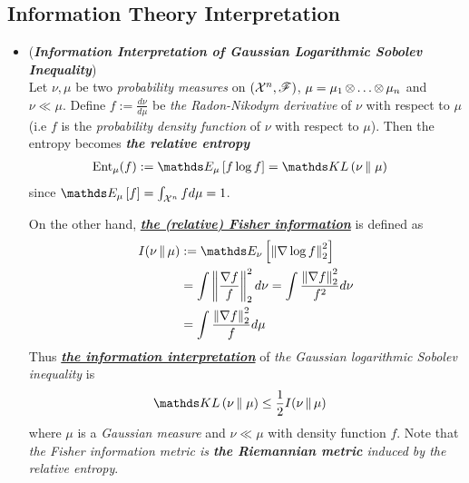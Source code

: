 \documentclass[11pt]{article}
\begin{document}
\subsection{Information Theory Interpretation}
\begin{itemize}
\item \begin{remark} (\textbf{\emph{Information Interpretation of Gaussian Logarithmic Sobolev Inequality}})\\
Let $\nu,\mu$ be two \emph{probability measures} on $({\mathcal X}^n, {\mathscr F})$, $\mu = \mu_1 \,{\otimes}\ldots{\otimes}\, \mu_n$ and $\nu \ll \mu$. Define $f:= \frac{d\nu}{d\mu}$ be \emph{the Radon-Nikodym derivative} of $\nu$ with respect to $\mu$ (i.e $f$ is the \emph{probability density function} of $\nu$ with respect to $\mu$). Then the entropy becomes \textbf{\emph{the relative entropy}}
\begin{align*}
\text{Ent}_{\mu}(f) &:= \E{\mu}{f \log f} = \kl{\nu}{\mu}
\end{align*} since $\E{\mu}{f} = \int_{\cX^n} fd\mu = 1$.

On the other hand, \underline{\emph{\textbf{the (relative) Fisher information}}} is defined as 
\begin{align*}
I(\nu \,\|\, \mu) &:= \E{\nu}{\norm{\nabla \log f}{2}^2} \\
&= \int \norm{\frac{\nabla f}{f}}{2}^2  d\nu =  \int \frac{\norm{\nabla f}{2}^2}{f^2}  d\nu \\
&= \int \frac{\norm{\nabla f}{2}^2}{f}  d\mu
\end{align*}
Thus \underline{\emph{\textbf{the information interpretation}}} of \emph{the Gaussian logarithmic Sobolev inequality} is
\begin{align}
\kl{\nu}{\mu} &\le \frac{1}{2}I(\nu \,\|\, \mu) \label{ineqn: log_sobolev_inequality_gaussian_infor} 
\end{align} where $\mu$ is a \emph{Gaussian measure} and $\nu \ll \mu$ with density function $f$.
Note that \emph{the Fisher information metric is \textbf{the Riemannian metric} induced by the relative entropy}.
\end{remark}
\end{itemize}
\end{document}
